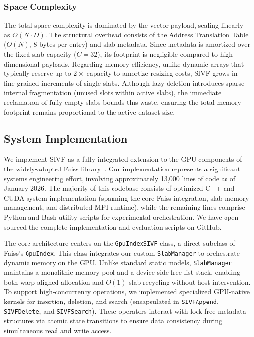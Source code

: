 \documentclass[sigconf,nonacm]{acmart}
\theoremstyle{plain}
\theoremstyle{definition}
\theoremstyle{remark}
\begin{document}
\subsubsection{Space Complexity}
The total space complexity is dominated by the vector payload, scaling linearly as $O(N \cdot D)$. The structural overhead consists of the Address Translation Table ($O(N)$, 8 bytes per entry) and slab metadata. Since metadata is amortized over the fixed slab capacity ($C=32$), its footprint is negligible compared to high-dimensional payloads. Regarding memory efficiency, unlike dynamic arrays that typically reserve up to $2 \times$ capacity to amortize resizing costs, SIVF grows in fine-grained increments of single slabs. Although lazy deletion introduces sparse internal fragmentation (unused slots within active slabs), the immediate reclamation of fully empty slabs bounds this waste, ensuring the total memory footprint remains proportional to the active dataset size.

\subsection{System Implementation}
\label{sec:implementation_details}

We implement SIVF as a fully integrated extension to the GPU components of the widely-adopted Faiss library~\cite{douze2024faiss}. Our implementation represents a significant systems engineering effort, involving approximately 13,000 lines of code as of January 2026. The majority of this codebase consists of optimized C++ and CUDA system implementation (spanning the core Faiss integration, slab memory management, and distributed MPI runtime), while the remaining lines comprise Python and Bash utility scripts for experimental orchestration. We have open-sourced the complete implementation and evaluation scripts on GitHub.

The core architecture centers on the \texttt{GpuIndexSIVF} class, a direct subclass of Faiss's \texttt{GpuIndex}. This class integrates our custom \texttt{SlabManager} to orchestrate dynamic memory on the GPU. Unlike standard static models, \texttt{SlabManager} maintains a monolithic memory pool and a device-side free list stack, enabling both warp-aligned allocation and $O(1)$ slab recycling without host intervention. To support high-concurrency operations, we implemented specialized GPU-native kernels for insertion, deletion, and search (encapsulated in \texttt{SIVFAppend}, \texttt{SIVFDelete}, and \texttt{SIVFSearch}). These operators interact with lock-free metadata structures via atomic state transitions to ensure data consistency during simultaneous read and write access.
\end{document}
